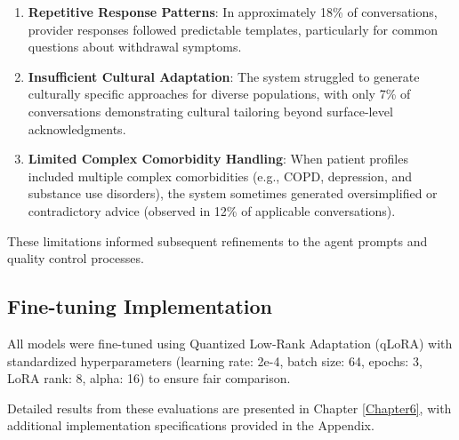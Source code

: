 \begin{enumerate}
    \item \textbf{Repetitive Response Patterns}: In approximately 18\% of conversations, provider responses followed predictable templates, particularly for common questions about withdrawal symptoms.

    \item \textbf{Insufficient Cultural Adaptation}: The system struggled to generate culturally specific approaches for diverse populations, with only 7\% of conversations demonstrating cultural tailoring beyond surface-level acknowledgments.

    \item \textbf{Limited Complex Comorbidity Handling}: When patient profiles included multiple complex comorbidities (e.g., COPD, depression, and substance use disorders), the system sometimes generated oversimplified or contradictory advice (observed in 12\% of applicable conversations).
\end{enumerate}

These limitations informed subsequent refinements to the agent prompts and quality control processes.

\subsection{Fine-tuning Implementation}

All models were fine-tuned using Quantized Low-Rank Adaptation (qLoRA) with standardized hyperparameters (learning rate: 2e-4, batch size: 64, epochs: 3, LoRA rank: 8, alpha: 16) to ensure fair comparison.

Detailed results from these evaluations are presented in Chapter \ref{Chapter6}, with additional implementation specifications provided in the Appendix.
